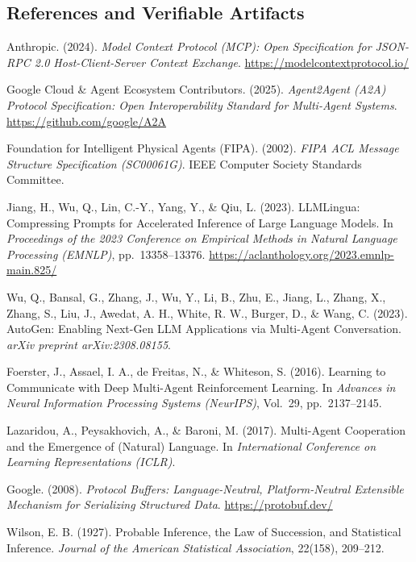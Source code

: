 \documentclass[9pt,a4paper]{extarticle}
\begin{document}
\subsection*{References and Verifiable Artifacts}
\begin{enumerate}[label={[\arabic*]},leftmargin=1.8em,itemsep=1pt,topsep=1.5pt]
  \item{\footnotesize Anthropic. (2024). \emph{Model Context Protocol (MCP): Open Specification for JSON-RPC 2.0 Host-Client-Server Context Exchange}. \url{https://modelcontextprotocol.io/}}
  \item{\footnotesize Google Cloud \& Agent Ecosystem Contributors. (2025). \emph{Agent2Agent (A2A) Protocol Specification: Open Interoperability Standard for Multi-Agent Systems}. \url{https://github.com/google/A2A}}
  \item{\footnotesize Foundation for Intelligent Physical Agents (FIPA). (2002). \emph{FIPA ACL Message Structure Specification (SC00061G)}. IEEE Computer Society Standards Committee.}
  \item{\footnotesize Jiang, H., Wu, Q., Lin, C.-Y., Yang, Y., \& Qiu, L. (2023). LLMLingua: Compressing Prompts for Accelerated Inference of Large Language Models. In \emph{Proceedings of the 2023 Conference on Empirical Methods in Natural Language Processing (EMNLP)}, pp.\ 13358--13376. \url{https://aclanthology.org/2023.emnlp-main.825/}}
  \item{\footnotesize Wu, Q., Bansal, G., Zhang, J., Wu, Y., Li, B., Zhu, E., Jiang, L., Zhang, X., Zhang, S., Liu, J., Awedat, A. H., White, R. W., Burger, D., \& Wang, C. (2023). AutoGen: Enabling Next-Gen LLM Applications via Multi-Agent Conversation. \emph{arXiv preprint arXiv:2308.08155}.}
  \item{\footnotesize Foerster, J., Assael, I. A., de Freitas, N., \& Whiteson, S. (2016). Learning to Communicate with Deep Multi-Agent Reinforcement Learning. In \emph{Advances in Neural Information Processing Systems (NeurIPS)}, Vol.\ 29, pp.\ 2137--2145.}
  \item{\footnotesize Lazaridou, A., Peysakhovich, A., \& Baroni, M. (2017). Multi-Agent Cooperation and the Emergence of (Natural) Language. In \emph{International Conference on Learning Representations (ICLR)}.}
  \item{\footnotesize Google. (2008). \emph{Protocol Buffers: Language-Neutral, Platform-Neutral Extensible Mechanism for Serializing Structured Data}. \url{https://protobuf.dev/}}
  \item{\footnotesize Wilson, E. B. (1927). Probable Inference, the Law of Succession, and Statistical Inference. \emph{Journal of the American Statistical Association}, 22(158), 209--212.}

\end{enumerate}
\end{document}
